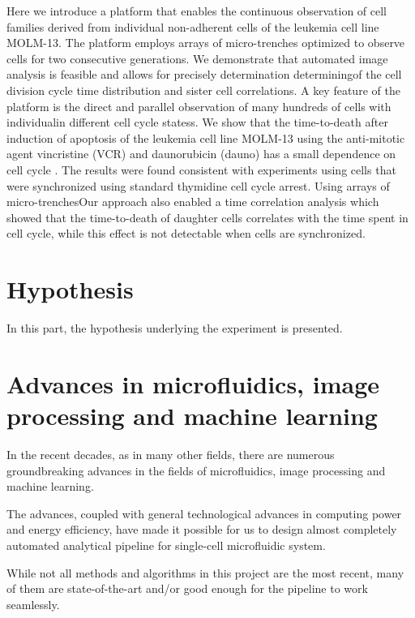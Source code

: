 \documentclass[pdftex,12pt,a4paper]{report}
\begin{document}
Here we introduce a platform that enables the continuous observation of cell families derived from individual non-adherent cells of the leukemia cell line MOLM-13. The platform employs arrays of micro-trenches optimized to observe cells for two consecutive generations. We demonstrate that automated image analysis is feasible and allows for precisely determination determiningof the cell division cycle time  distribution and sister cell correlations. A key feature of the platform is the direct and parallel observation of many hundreds of cells with individualin different cell cycle statess. We show that the time-to-death after induction of apoptosis of the leukemia cell line MOLM-13 using the anti-mitotic agent vincristine (VCR) and daunorubicin (dauno) has a small dependence on cell cycle . The results were found consistent with experiments using cells that were synchronized using standard thymidine cell cycle arrest. Using arrays of micro-trenchesOur approach also enabled a time correlation analysis which showed that the time-to-death of daughter cells correlates with the time spent in cell cycle, while this effect is not detectable when cells are synchronized. 


\section{Hypothesis}

In this part, the hypothesis underlying the experiment is presented.

\section{Advances in microfluidics, image processing and machine learning}

In the recent decades, as in many other fields, there are numerous groundbreaking advances in the fields of microfluidics, image processing and machine learning.


The advances, coupled with general technological advances in computing power and energy efficiency, have made it possible for us to design almost completely automated analytical pipeline for single-cell microfluidic system.


While not all methods and algorithms in this project are the most recent, many of them are state-of-the-art and/or good enough for the pipeline to work seamlessly.
\end{document}
